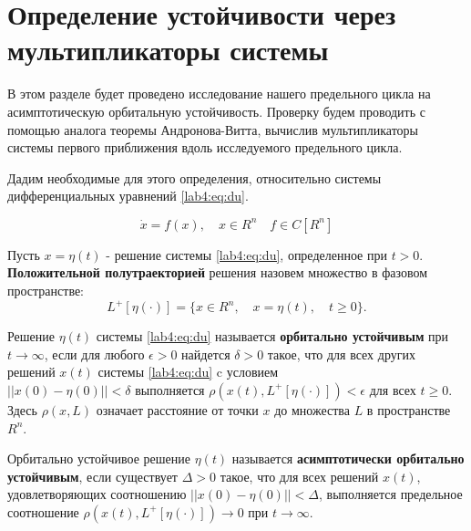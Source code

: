 \chapter{Определение устойчивости через мультипликаторы системы}\label{lab4}

В этом разделе будет проведено исследование нашего предельного цикла
на асимптотическую орбитальную устойчивость. Проверку будем проводить с помощью
аналога теоремы Андронова-Витта, вычислив мультипликаторы системы первого
приближения вдоль исследуемого предельного цикла.

Дадим необходимые для этого определения\cite{bookdiff}, относительно системы
дифференциальных уравнений \eqref{lab4:eq:du}.

\begin{equation}\label{lab4:eq:du}
    \dot{x} = f(x), \quad x \in R^n \quad f \in C[R^n]
\end{equation}

\begin{definition}
    Пусть $x = \eta(t)$ - решение системы \eqref{lab4:eq:du},
    определенное при $t > 0$. \textbf{Положительной полутраекторией}
    решения назовем множество в фазовом пространстве:
    \begin{equation*}
        L^+[\eta(\cdot)] = \{x\in R^n, \quad x = \eta(t), \quad t \geq 0\}.
    \end{equation*}
\end{definition}

\begin{definition}
    Решение $\eta(t)$ системы \eqref{lab4:eq:du} называется
    \textbf{орбитально устойчивым} при $t \rightarrow \infty$,
    если для любого $\epsilon > 0$ найдется $\delta > 0$
    такое, что для всех других решений $x(t)$
    системы \eqref{lab4:eq:du} c условием \\
    $||x(0) - \eta(0)|| < \delta$ выполняется
    $\rho(x(t), L^+[\eta(\cdot)]) < \epsilon$ для всех $t \geq 0$.
    Здесь $\rho(x,L)$ означает расстояние от точки $x$ до множества
    $L$ в пространстве $R^n$.
\end{definition}

\begin{definition}
    Орбитально устойчивое решение $\eta(t)$ называется
    \textbf{асимптотически орбитально устойчивым},
    если существует $\Delta > 0$ такое, что для всех решений
    $x(t)$, удовлетворяющих соотношению $||x(0) - \eta(0)|| < \Delta$,
    выполняется предельное соотношение $\rho(x(t), L^+[\eta(\cdot)]) \rightarrow 0$
    при $t \rightarrow \infty$.
\end{definition}

